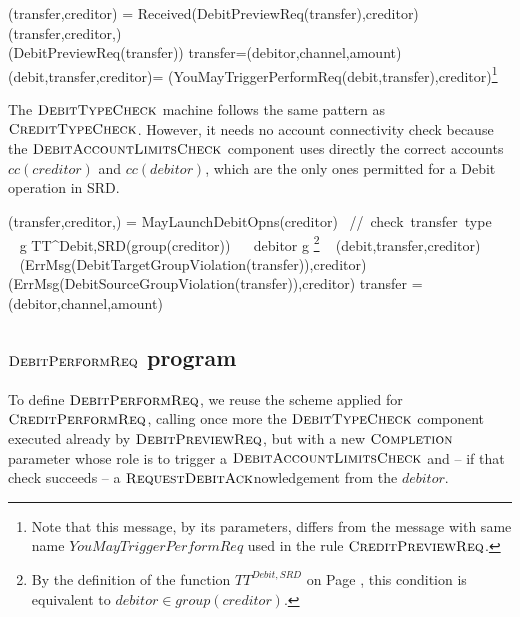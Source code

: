\begin{asm}
(transfer,creditor)  =\+
  \IF Received(DebitPreviewReq(transfer),\FROM creditor) \THEN \+   
      (transfer,creditor,)\\
      (DebitPreviewReq(transfer)) \-
\WHERE \+
transfer=(debitor,channel,amount)\\
(debit,transfer,creditor)=\+
(YouMayTriggerPerformReq(debit,transfer),\TO  creditor)\footnote{Note that this message,  by its parameters, differs from the message with same name $YouMayTriggerPerformReq$ used in the rule $\hbox{\sc CreditPreviewReq}$.}
\end{asm}

The $\hbox{\sc DebitTypeCheck}$ machine follows the same pattern as $\hbox{\sc CreditTypeCheck}$. However, it needs no account connectivity check because the $\hbox{\sc DebitAccountLimitsCheck}$ component uses directly the correct accounts  $cc(creditor)$ and $cc(debitor)$, which are the only ones permitted for a Debit operation in SRD.


\begin{asm}
(transfer,creditor,)  =\+
\IF MayLaunchDebitOpns(creditor) \mbox{  // check transfer type}\+
  \THEN ~ \IF  ~ \FORSOME g \in TT^{Debit,SRD}(group(creditor)) 
          ~~ debitor \in g \footnote{By the definition of the function $TT^{Debit,SRD}$ on Page \pageref{debitdomaindef}, this condition is equivalent to $debitor \in group(creditor)$.} \+
       \THEN  ~ (debit,transfer,creditor) \\
        \ELSE ~ 
        (ErrMsg(DebitTargetGroupViolation(transfer)),\TO creditor) \- 
  \ELSE ~ 
  (ErrMsg(DebitSourceGroupViolation(transfer)),\TO creditor)\-
 \WHERE \+
   transfer = (debitor,channel,amount) 
\end{asm}



\subsection{$\hbox{\sc DebitPerformReq}$ program}
\label{sect:debitperform}

To define $\hbox{\sc DebitPerformReq}$, we reuse the scheme applied for $\hbox{\sc CreditPerformReq}$, calling once more the $\hbox{\sc DebitTypeCheck}$ component executed already by $\hbox{\sc DebitPreviewReq}$, but with a new $\hbox{\sc Completion}$ parameter whose role is to trigger a $\hbox{\sc DebitAccountLimitsCheck}$ and -- if that check succeeds -- a $\hbox{\sc RequestDebitAck}$nowledgement from the $debitor$.   

